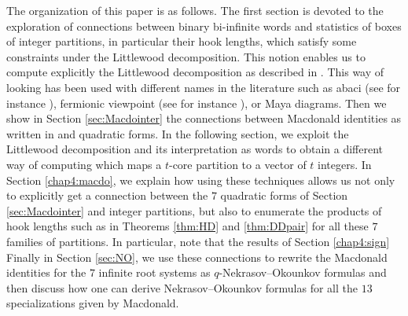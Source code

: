 \documentclass[11pt,letterpaper]{amsart}
\def\det{{\rm det}}
\numberwithin{equation}{section}
\numberwithin{df}{section}
\begin{document}


The organization of this paper is as follows. The first section is devoted to the exploration of connections between binary bi-infinite words and statistics of boxes of integer partitions, in particular their hook lengths, which satisfy some constraints under the Littlewood decomposition. This notion enables us to compute explicitly the Littlewood decomposition as described in \cite{HJ}. This way of looking has been used with different names in the literature such as abaci (see for instance \cite{BN}), fermionic viewpoint (see for instance \cite{Johnson}), or Maya diagrams.
Then we show in Section \ref{sec:Macdointer} the connections between Macdonald identities as written in \cite[Proposition $6.1$]{RS} and quadratic forms. In the following section, we exploit the Littlewood decomposition and its interpretation as words to obtain a different way of computing \cite[Bijection $2$]{GKS} which maps a $t$-core partition to a vector of $t$ integers. In Section \ref{chap4:macdo}, we explain how using these techniques allows us not only to explicitly get a connection between the $7$ quadratic forms of Section \ref{sec:Macdointer} and integer partitions, but also to enumerate the products of hook lengths such as in Theorems \ref{thm:HD} and \ref{thm:DDpair} for all these $7$ families of partitions. In particular, note that the results of Section \ref{chap4:sign} 
Finally in Section \ref{sec:NO}, we use these connections to rewrite the Macdonald identities for the $7$ infinite root systems as $q$-Nekrasov--Okounkov formulas and then discuss how one can derive Nekrasov--Okounkov formulas for all the $13$ specializations given by Macdonald.

%
%
\end{document}
